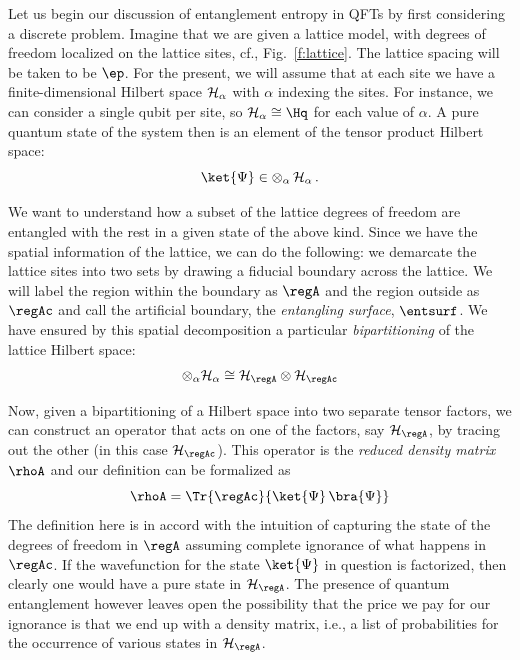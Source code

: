 \documentclass[12pt,openany]{book}
\begin{document}
Let us begin our discussion of entanglement entropy in QFTs by first considering a discrete problem. Imagine that we are given a lattice model, with degrees of freedom localized on the lattice sites, cf., Fig.~\ref{f:lattice}. The lattice spacing will be taken to be $\ep$. For the present, we will assume that  at each site we have a finite-dimensional Hilbert space ${\cal H}_{\alpha}$ with $\alpha$ indexing the sites.  For instance, we can consider a single qubit per site, so ${\cal H}_\alpha \cong \Hq$ for each value of
$\alpha$. A pure quantum state of the system then is an element of the tensor product Hilbert space:
%
\begin{equation}
\ket{\Psi}  \in \otimes_\alpha\, {\cal H}_\alpha\,.
\end{equation}
%

We want to understand how a subset of the lattice degrees of freedom are entangled with the rest in a given state of the above kind. Since we have the spatial information of the lattice, we can do the following: we demarcate the lattice sites into two sets by drawing a fiducial boundary across the lattice. We will label the region within the boundary as $\regA$ and the region outside as $\regAc$ and call the artificial boundary, the {\em entangling surface}, $\entsurf$. We have ensured by this spatial decomposition a particular {\em bipartitioning} of the lattice Hilbert space:
%
\begin{align}
\otimes_\alpha{\cal H}_\alpha \cong {\cal H}_\regA \otimes {\cal H}_{\regAc}
\end{align}
%

Now, given a bipartitioning of a Hilbert space into two separate tensor factors, we can construct an operator that acts on one of the factors, say ${\cal H}_\regA$, by tracing out the other (in this case ${\cal H}_\regAc$).  This operator is the {\em  reduced density matrix}  $\rhoA$ and our definition can be formalized as
%
\begin{equation}
\rhoA = \Tr{\regAc}{ \ket{\Psi} \,\bra{\Psi}}
\label{eq:rhoAdef}
\end{equation}
%
The definition here is in accord with the intuition  of capturing the state of the degrees of freedom in $\regA$  assuming complete ignorance of what happens in $\regAc$. If the wavefunction for the state $\ket{\Psi}$ in question is factorized, then clearly one would have a pure state in ${\cal H}_\regA$. The presence of quantum entanglement however leaves open the possibility that the price we pay for our ignorance is that we end up with a density matrix, i.e., a list of probabilities for the occurrence of various states in ${\cal H}_\regA$.
\end{document}
